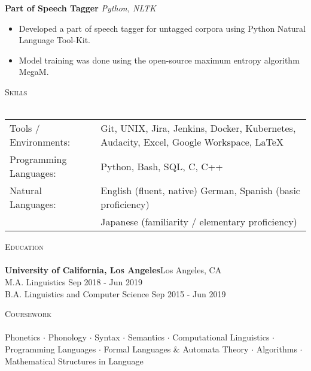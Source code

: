 \documentclass[]{article}
\newcommand{\lineunder} {
	\vspace*{-8pt} \\
	\hspace*{-18pt} \hrulefill \\
}
\newcommand{\header} [1] {
	{\hspace*{-18pt}\vspace*{6pt} \textsc{#1}}
	\vspace*{-6pt} \lineunder
}
\begin{document}
	{\textbf{Part of Speech Tagger}} \hspace*{5mm} {\sl Python, NLTK} \\
	\vspace*{-5pt}\begin{itemize}	\itemsep 0pt
		\item Developed a part of speech tagger for untagged corpora using Python Natural Language Tool-Kit.
		\item Model training was done using the open-source maximum entropy algorithm MegaM.
	\end{itemize}
	\vspace*{0mm}
	
	\header{Skills}
	\begin{tabular}{ l p{11.2cm} }
		Tools / Environments:  & Git, UNIX, Jira, Jenkins, Docker, Kubernetes, Audacity, Excel, Google Workspace, \LaTeX
		\\
		Programming Languages: & Python, Bash, SQL, C, C++
		\\
		Natural Languages:     & English \hfill (fluent, native) \newline German, Spanish \hfill (basic proficiency)
		\\
		\newline & Japanese \hfill (familiarity / elementary proficiency)
		\\
	\end{tabular}
	\vspace{2mm}
	
	
	\header{Education}
	\textbf{University of California, Los Angeles}\hfill Los Angeles, CA\\
	M.A. Linguistics \hfill Sep 2018 - Jun 2019\\
	\vspace{1mm}
	B.A. Linguistics and Computer Science \hfill Sep 2015 - Jun 2019\\
	\vspace{1mm}
	\vspace{1mm}
	
	\header{Coursework}
	Phonetics $\cdot$ Phonology $\cdot$ Syntax $\cdot$ Semantics $\cdot$ Computational Linguistics $\cdot$ Programming Languages $\cdot$ Formal Languages \& Automata Theory $\cdot$ Algorithms $\cdot$ Mathematical Structures in Language
	\vspace*{10mm}
	
\end{document}
